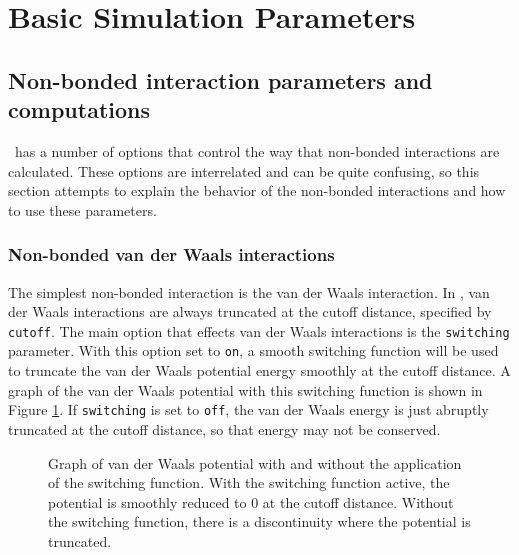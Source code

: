 \section{Basic Simulation Parameters}
\label{section:basic}


\subsection{Non-bonded interaction parameters and computations}
\label{section:electdesc}

\NAMD\ has a number of options that control the way that non-bonded
interactions are calculated.  These options are interrelated and
can be quite confusing, so this section attempts to explain the
behavior of the non-bonded interactions and how to use these
parameters.

\subsubsection{Non-bonded van der Waals interactions}
The simplest non-bonded 
interaction is the van der Waals interaction.  In 
\NAMD, van der Waals interactions are always truncated at the 
cutoff distance, specified by {\tt cutoff}.  
The main option that effects van der Waals interactions
is the {\tt switching} parameter.  With this option set to {\tt on},
a smooth switching function will be used to truncate the
van der Waals potential energy smoothly at the cutoff distance.  
A graph of the van der Waals 
potential with this switching function is shown in Figure 
\ref{fig:switching}.  If {\tt switching} is set to {\tt off}, the 
van der Waals energy is just abruptly truncated at the cutoff 
distance, so that energy may not be conserved.  

\begin{figure}[htb]
  \caption[Graph of van der Waals potential with and without switching]
  {\small Graph of van der Waals potential with and without the
  application of the switching function.  With the switching function
  active, the potential is smoothly reduced to 0 at the cutoff distance.
  Without the switching function, there is a discontinuity where the
  potential is truncated.}
  \label{fig:switching}
\end{figure}

